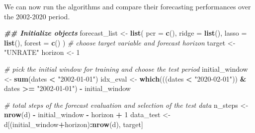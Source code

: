 \documentclass[
]{book}
\newenvironment{Shaded}{\begin{snugshade}}{\end{snugshade}}
\newcommand{\AttributeTok}[1]{\textcolor[rgb]{0.13,0.29,0.53}{#1}}
\newcommand{\CommentTok}[1]{\textcolor[rgb]{0.56,0.35,0.01}{\textit{#1}}}
\newcommand{\DecValTok}[1]{\textcolor[rgb]{0.00,0.00,0.81}{#1}}
\newcommand{\DocumentationTok}[1]{\textcolor[rgb]{0.56,0.35,0.01}{\textbf{\textit{#1}}}}
\newcommand{\FunctionTok}[1]{\textcolor[rgb]{0.13,0.29,0.53}{\textbf{#1}}}
\newcommand{\NormalTok}[1]{#1}
\newcommand{\OtherTok}[1]{\textcolor[rgb]{0.56,0.35,0.01}{#1}}
\newcommand{\SpecialCharTok}[1]{\textcolor[rgb]{0.81,0.36,0.00}{\textbf{#1}}}
\newcommand{\StringTok}[1]{\textcolor[rgb]{0.31,0.60,0.02}{#1}}
\begin{document}
We can now run the algorithms and compare their forecasting performances over the 2002-2020 period.

\begin{Shaded}
\begin{Highlighting}[]
\DocumentationTok{\#\# Initialize objects}
\NormalTok{forecast\_list }\OtherTok{\textless{}{-}} \FunctionTok{list}\NormalTok{(}
  \AttributeTok{pcr =} \FunctionTok{c}\NormalTok{(),}
  \AttributeTok{ridge =} \FunctionTok{list}\NormalTok{(),}
  \AttributeTok{lasso =} \FunctionTok{list}\NormalTok{(),}
  \AttributeTok{forest =} \FunctionTok{c}\NormalTok{()}
\NormalTok{)}
\CommentTok{\# choose target variable and forecast horizon}
\NormalTok{target }\OtherTok{\textless{}{-}} \StringTok{"UNRATE"}
\NormalTok{horizon }\OtherTok{\textless{}{-}} \DecValTok{1}

\CommentTok{\# pick the initial window for training and choose the test period}
\NormalTok{initial\_window }\OtherTok{\textless{}{-}} \FunctionTok{sum}\NormalTok{(dates }\SpecialCharTok{\textless{}} \StringTok{"2002{-}01{-}01"}\NormalTok{)}
\NormalTok{idx\_eval }\OtherTok{\textless{}{-}} \FunctionTok{which}\NormalTok{(((dates }\SpecialCharTok{\textless{}} \StringTok{"2020{-}02{-}01"}\NormalTok{)) }\SpecialCharTok{\&} 
\NormalTok{                    dates }\SpecialCharTok{\textgreater{}=} \StringTok{"2002{-}01{-}01"}\NormalTok{) }\SpecialCharTok{{-}}\NormalTok{ initial\_window}

\CommentTok{\# total steps of the forecast evaluation and selection of the test data}
\NormalTok{n\_steps }\OtherTok{\textless{}{-}} \FunctionTok{nrow}\NormalTok{(d) }\SpecialCharTok{{-}}\NormalTok{ initial\_window }\SpecialCharTok{{-}}\NormalTok{ horizon }\SpecialCharTok{+} \DecValTok{1} 
\NormalTok{data\_test }\OtherTok{\textless{}{-}}\NormalTok{ d[(initial\_window}\SpecialCharTok{+}\NormalTok{horizon)}\SpecialCharTok{:}\FunctionTok{nrow}\NormalTok{(d), target]}
\end{Highlighting}
\end{Shaded}
\end{document}
